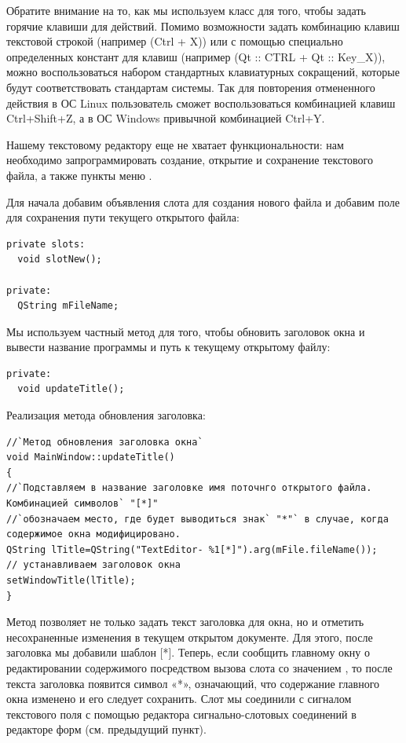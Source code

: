 Обратите внимание на то, как мы используем класс   
для того, чтобы задать
горячие клавиши для действий. Помимо возможности задать комбинацию клавиш текстовой строкой 
(например  (Ctrl + X)) или с помощью специально определенных констант для 
клавиш (например  (Qt :: CTRL + Qt :: Key\_X)), можно воспользоваться 
набором стандартных клавиатурных сокращений, которые будут соответствовать стандартам системы. 
Так для повторения отмененного действия в ОС Linux пользователь сможет воспользоваться комбинацией
клавиш Ctrl+Shift+Z, а в ОС Windows привычной комбинацией Ctrl+Y. 

Нашему текстовому редактору еще не хватает функциональности: нам необходимо запрограммировать создание, открытие и
сохранение текстового файла, а также пункты меню .

Для начала добавим объявления слота для создания нового файла и добавим поле для сохранения пути текущего открытого
файла: 
\begin{lstlisting}
private slots:
  void slotNew();

private:
  QString mFileName;
\end{lstlisting}

Мы используем частный метод  для того, чтобы обновить заголовок окна и вывести название 
программы и путь к текущему открытому файлу: 
\begin{lstlisting}
private:
  void updateTitle();
\end{lstlisting}

Реализация метода обновления заголовка: 
\begin{lstlisting}
//`Метод обновления заголовка окна`
void MainWindow::updateTitle()
{
//`Подставляем в название заголовке имя поточнго открытого файла. Комбинацией символов` "[*]" 
//`обозначаем место, где будет выводиться знак` "*"` в случае, когда содержимое окна модифицировано.
QString lTitle=QString("TextEditor- %1[*]").arg(mFile.fileName());
// устанавливаем заголовок окна 
setWindowTitle(lTitle);
}
\end{lstlisting}


Метод  позволяет не только задать текст заголовка для окна, 
но и отметить несохраненные изменения в
текущем открытом документе. Для этого, после заголовка мы добавили шаблон [*]. 
Теперь, если сообщить главному окну о
редактировании содержимого посредством вызова слота  
со значением , то после текста
заголовка появится символ «*», означающий, что содержание главного окна изменено 
и его следует сохранить. Слот
 мы соединили с сигналом  
текстового поля  с помощью
редактора сигнально-слотовых соединений в редакторе форм (см. предыдущий пункт). 

